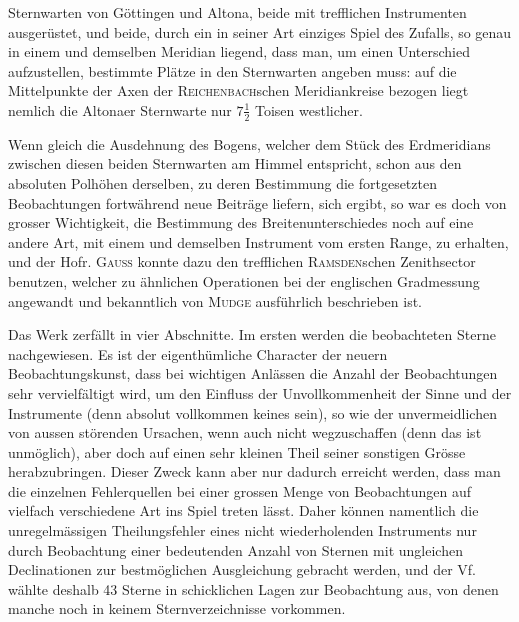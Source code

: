 \par\clearpage
\noindent{}\makebox[12mm][r]{}\par\medskip

\noindent Sternwarten von Göttingen und Altona, beide mit trefflichen Instrumenten
ausgerüstet, und beide, durch ein in seiner Art einziges Spiel des Zufalls, so
genau in einem und demselben Meridian liegend, dass man, um einen
Unterschied aufzustellen, bestimmte Plätze in den Sternwarten angeben muss: auf
die Mittelpunkte der Axen der \textsc{Reichenbach}schen Meridiankreise bezogen
liegt nemlich die Altonaer Sternwarte nur \(7\tfrac12\) Toisen westlicher.

Wenn gleich die Ausdehnung des Bogens, welcher dem Stück des
Erdmeridians zwischen diesen beiden Sternwarten am Himmel entspricht, schon
aus den absoluten Polhöhen derselben, zu deren Bestimmung die fortgesetzten
Beobachtungen fortwährend neue Beiträge liefern, sich ergibt, so war es doch
von grosser Wichtigkeit, die Bestimmung des Breitenunterschiedes noch auf
eine andere Art, mit einem und demselben Instrument vom ersten Range, zu
erhalten, und der Hofr. \textsc{Gauss} konnte dazu den trefflichen \textsc{Ramsden}schen
Zenithsector benutzen, welcher zu ähnlichen Operationen bei der englischen
Gradmessung angewandt und bekanntlich von \textsc{Mudge} ausführlich beschrieben ist.

Das Werk zerfällt in vier Abschnitte. Im ersten werden die beobachteten
Sterne nachgewiesen. Es ist der eigenthümliche Character der neuern
Beobachtungskunst, dass bei wichtigen Anlässen die Anzahl der Beobachtungen
sehr vervielfältigt wird, um den Einfluss der Unvollkommenheit der Sinne und
der Instrumente (denn absolut vollkommen  keines sein), so wie der
unvermeidlichen von aussen störenden Ursachen, wenn auch nicht wegzuschaffen
(denn das ist unmöglich), aber doch auf einen sehr kleinen Theil seiner
sonstigen Grösse herabzubringen. Dieser Zweck kann aber nur dadurch erreicht
werden, dass man die einzelnen Fehlerquellen bei einer grossen Menge von
Beobachtungen auf vielfach verschiedene Art ins Spiel treten lässt. Daher
können namentlich die unregelmässigen Theilungsfehler eines nicht
wiederholenden Instruments nur durch Beobachtung einer bedeutenden Anzahl von
Sternen mit ungleichen Declinationen zur bestmöglichen Ausgleichung gebracht
werden, und der Vf. wählte deshalb 43 Sterne in schicklichen Lagen zur
Beobachtung aus, von denen manche noch in keinem Sternverzeichnisse vorkommen.

